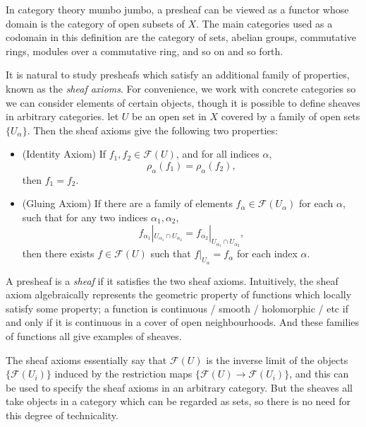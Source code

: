 In category theory mumbo jumbo, a presheaf can be viewed as a functor whose domain is the category of open subsets of $X$. The main categories used as a codomain in this definition are the category of sets, abelian groups, commutative rings, modules over a commutative ring, and so on and so forth.

It is natural to study presheafs which satisfy an additional family of properties, known as the \emph{sheaf axioms}. For convenience, we work with concrete categories so we can consider elements of certain objects, though it is possible to define sheaves in arbitrary categories. let $U$ be an open set in $X$ covered by a family of open sets $\{ U_\alpha \}$. Then the sheaf axioms give the following two properties:
%
\begin{itemize}
    \item (Identity Axiom) If $f_1,f_2 \in \mathcal{F}(U)$, and for all indices $\alpha$,
    \[ \rho_\alpha(f_1) = \rho_\alpha(f_2), \]
    then $f_1 = f_2$.

    \item (Gluing Axiom) If there are a family of elements $f_\alpha \in \mathcal{F}(U_\alpha)$ for each $\alpha$, such that for any two indices $\alpha_1,\alpha_2$,
    \[ f_{\alpha_1}|_{U_{\alpha_1} \cap U_{\alpha_2}} = f_{\alpha_2}|_{U_{\alpha_1} \cap U_{\alpha_2}}, \]
    then there exists $f \in \mathcal{F}(U)$ such that $f|_{U_\alpha} = f_\alpha$ for each index $\alpha$.
\end{itemize}
%
A presheaf is a \emph{sheaf} if it satisfies the two sheaf axioms. Intuitively, the sheaf axiom algebraically represents the geometric property of functions which locally satisfy some property; a function is continuous / smooth / holomorphic / etc if and only if it is continuous in a cover of open neighbourhoods. And these families of functions all give examples of sheaves.

\begin{remark}
    The sheaf axioms essentially say that $\mathcal{F}(U)$ is the inverse limit of the objects $\{ \mathcal{F}(U_i) \}$ induced by the restriction maps $\{ \mathcal{F}(U) \to \mathcal{F}(U_i) \}$, and this can be used to specify the sheaf axioms in an arbitrary category. But the sheaves all take objects in a category which can be regarded as sets, so there is no need for this degree of technicality.
\end{remark}

